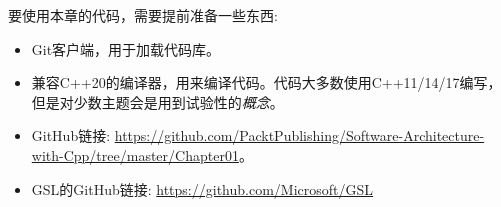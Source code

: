 要使用本章的代码，需要提前准备一些东西:

\begin{itemize}
\item 
Git客户端，用于加载代码库。

\item 
兼容C++20的编译器，用来编译代码。代码大多数使用C++11/14/17编写，但是对少数主题会是用到试验性的\textit{概念}。

\item 
GitHub链接: \url{https://github.com/PacktPublishing/Software-Architecture-with-Cpp/tree/master/Chapter01}。

\item 
GSL的GitHub链接: \url{https://github.com/Microsoft/GSL}

\end{itemize}